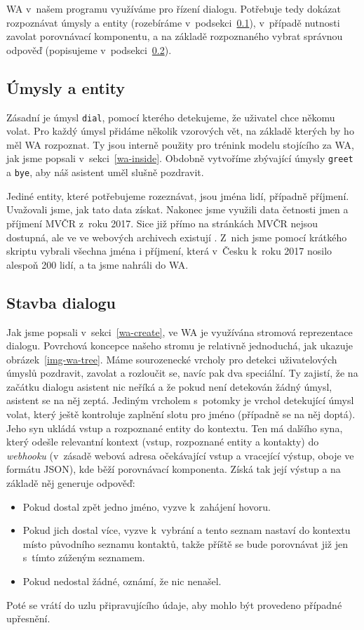 WA v~našem programu využíváme pro řízení dialogu. Potřebuje tedy dokázat
rozpoznávat úmysly a entity (rozebíráme v~podsekci~\ref{intents-entities}),
v~případě nutnosti zavolat porovnávací komponentu, a na základě
rozpoznaného vybrat správnou odpověď (popisujeme v~podsekci~\ref{building-dialog}).

\subsection{Úmysly a entity}\label{intents-entities}

Zásadní je úmysl
\texttt{dial}, pomocí kterého detekujeme, že uživatel chce někomu volat. Pro
každý úmysl přidáme několik vzorových vět, na základě kterých by ho měl WA
rozpoznat. Ty jsou interně použity pro trénink modelu stojícího za WA, jak
jsme popsali v~sekci~\ref{wa-inside}.
Obdobně vytvoříme zbývající úmysly \texttt{greet} a \texttt{bye}, aby náš
asistent uměl slušně pozdravit.

Jediné entity, které potřebujeme rozeznávat, jsou jména lidí, případně příjmení.
Uvažovali jsme, jak tato
data získat. Nakonec jsme využili data četnosti jmen a příjmení MVČR z~roku 2017.
Sice již přímo na stránkách MVČR nejsou dostupná, ale ve ve webových archivech
existují \citep{mvcr_cetnost_2018}. Z~nich jsme pomocí krátkého skriptu vybrali
všechna jména i příjmení, která v~Česku k~roku 2017 nosilo alespoň
200 lidí, a ta jsme nahráli do WA.

\subsection{Stavba dialogu}\label{building-dialog}

Jak jsme popsali v~sekci~\ref{wa-create}, ve WA je využívána stromová reprezentace dialogu.
Povrchová koncepce našeho stromu je relativně jednoduchá, jak ukazuje obrázek~\ref{img-wa-tree}.
Máme sourozenecké
vrcholy pro detekci uživatelových úmyslů pozdravit, zavolat a rozloučit se, navíc
pak dva speciální. Ty zajistí, že na začátku dialogu asistent nic neříká a že
pokud není detekován žádný úmysl, asistent se na něj zeptá. Jediným vrcholem
s~potomky je vrchol detekující úmysl volat, který ještě kontroluje zaplnění slotu
pro jméno (případně se na něj doptá). Jeho syn ukládá vstup a rozpoznané entity
do kontextu. Ten
má dalšího syna, který odešle relevantní kontext (vstup, rozpoznané entity a kontakty)
do \textit{webhooku} (v~zásadě webová adresa očekávající vstup a vracející
výstup, oboje ve formátu JSON), kde běží porovnávací komponenta. Získá tak její
výstup a na základě něj generuje odpověď:
\begin{itemize}
    \item Pokud dostal zpět jedno jméno, vyzve k~zahájení hovoru.
    \item Pokud jich dostal více, vyzve k~vybrání a tento seznam nastaví do kontextu místo původního
          seznamu kontaktů, takže příště se bude porovnávat již jen s~tímto zúženým seznamem.
    \item Pokud nedostal žádné, oznámí, že nic nenašel.
\end{itemize}
Poté se vrátí do uzlu připravujícího údaje, aby mohlo být provedeno případné
upřesnění.

